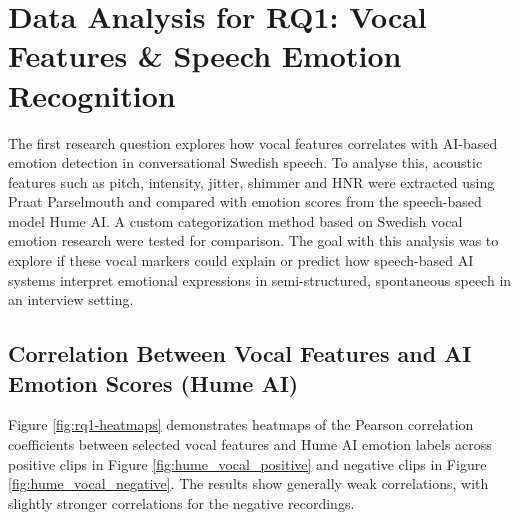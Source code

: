 \section{Data Analysis for RQ1: Vocal Features \& Speech Emotion Recognition}
The first research question explores how vocal features correlates with AI-based emotion detection in conversational Swedish speech. 
To analyse this, acoustic features such as pitch, intensity, jitter, shimmer and HNR were extracted using Praat Parselmouth and compared with emotion 
scores from the speech-based model Hume AI. A custom categorization method based on Swedish vocal emotion research \autocite{Ekberg2023} were tested for comparison. 
The goal with this analysis was to explore if these vocal markers could explain or predict how speech-based AI systems interpret emotional expressions in 
semi-structured, spontaneous speech in an interview setting. 

\subsection{Correlation Between Vocal Features and AI Emotion Scores (Hume AI)}
Figure \ref{fig:rq1-heatmaps} demonstrates heatmaps of the Pearson correlation coefficients between selected vocal features and Hume AI emotion labels across positive clips in Figure \ref{fig:hume_vocal_positive} and negative clips in Figure \ref{fig:hume_vocal_negative}. The results show generally weak correlations, with slightly stronger correlations for the negative recordings.  

